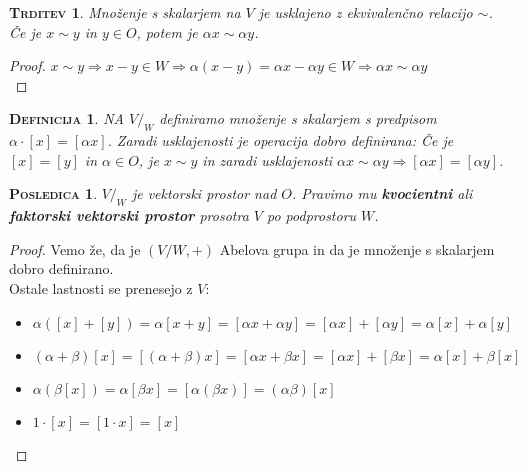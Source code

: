 \documentclass[a4paper,12pt]{article}
\newtheorem*{trditev}{\textsc{Trditev}}
\newtheorem*{posledica}{\textsc{Posledica}}
\newtheorem*{definicija}{\textsc{Definicija}}
\begin{document}
\begin{trditev}
Množenje s skalarjem na $V$ je usklajeno z ekvivalenčno relacijo $\sim$. Če je $x\sim y$ in $y\in O$, potem je $\alpha x \sim \alpha y$.\\
\end{trditev}

\begin{proof} 
	$x\sim y \Rightarrow x-y\in W \Rightarrow \alpha(x-y)=\alpha x-\alpha y\in W \Rightarrow \alpha x \sim \alpha y$ \\
\end{proof}

\begin{definicija}
	NA $V/_W$ definiramo množenje s skalarjem s predpisom $\alpha \cdot [x]=[\alpha x]$. Zaradi usklajenosti je operacija dobro definirana: Če je $[x]=[y]$ in $\alpha \in O$, je $x\sim y$ in zaradi usklajenosti $\alpha x \sim \alpha y \Rightarrow [\alpha x] = [\alpha y]$. \\
\end{definicija}

\begin{posledica}
	$V/_W$ je vektorski prostor nad $O$. Pravimo mu \textbf{kvocientni} ali \linebreak  \textbf{faktorski vektorski prostor} prosotra $V$ po podprostoru $W$.\\
\end{posledica}

\begin{proof}
	Vemo že, da je $(V/W,+)$ Abelova grupa in da je množenje s skalarjem dobro  \linebreak definirano. \\

	Ostale lastnosti se prenesejo z $V$:\\
	
	\begin{itemize}
		\item $\alpha([x]+[y])=\alpha [x+y]=[\alpha x + \alpha y]=[\alpha x]+[\alpha y]=\alpha[x] + \alpha [y]$
		\item $(\alpha + \beta)[x] = [(\alpha + \beta)x]=[\alpha x + \beta x]=[\alpha x]+[\beta x]=\alpha[x]+\beta[x]$
		\item $\alpha(\beta[x])=\alpha[\beta x]=[\alpha(\beta x)]=(\alpha \beta)[x]$
		\item $1\cdot [x]=[1\cdot x]=[x]$ \\
	\end{itemize}
\end{proof}
\end{document}
